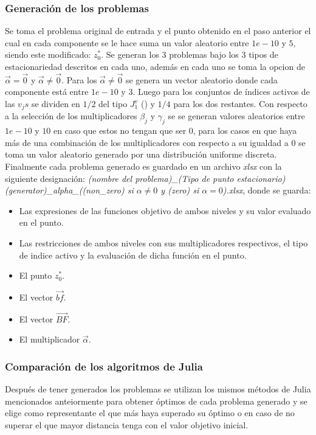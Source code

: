 \subsubsection{Generación de los problemas}
Se toma el problema original de entrada y el punto obtenido en el paso anterior el cual en cada componente se le hace suma un
valor aleatorio entre $1e-10$ y $5$, siendo este modificado: $z^*_0$. 
Se generan los 3 problemas bajo los 3 tipos de estacionariedad descritos en cada uno, 
además en cada uno se toma la opcion de $\vec{\alpha}=\vec{0}$ y $\vec{\alpha}\ne \vec{0}$.
Para los $\vec{\alpha}\neq \vec{0}$ se genera un vector aleatorio donde cada componente está entre $1e-10$ y $3$.
Luego para los conjuntos de índices activos de las $v_{j}s$ se dividen en $1/2$ del tipo $J_1^v$ () y $1/4$ para los dos restantes.
Con respecto a la selección de los multiplicadores $\beta_j$ y $\gamma_j$ se 
se generan valores aleatorios entre $1e-10$ y $10$ en caso que estos no tengan que ser $0$, 
para los casos en que haya más de una combinación de los multiplicadores con respecto a su igualdad a $0$
se toma un valor aleatorio generado por una distribución uniforme discreta.
Finalmente cada problema generado es guardado en un archivo \textit{xlsx} con la siguiente designación:
\textit{(nombre del problema)\_(Tipo de punto estacionario)(generator)\_alpha\_((non\_zero) si $\alpha \neq 0$ y (zero) si $\alpha = 0$).xlsx},
donde se guarda: 
\begin{itemize}
    \item Las expresiones de las funciones objetivo de ambos niveles y su valor evaluado en el punto.
    \item Las restricciones de ambos niveles con sus multiplicadores respectivos, el tipo de indice activo y la evaluación de dicha función en el punto.
    \item El punto $z^*_0$.
    \item El vector $\vec{bf}.$
    \item El vector $\vec{BF}$.
    \item El multiplicador $\vec{\alpha}$.
\end{itemize}

\subsubsection{Comparación de los algoritmos de Julia}
Después de tener generados los problemas se utilizan los mismos métodos de Julia mencionados anteiormente
para obtener óptimos de cada problema generado y se elige como representante el que más haya superado su óptimo o en caso de no superar el que mayor distancia tenga con el valor objetivo inicial.

